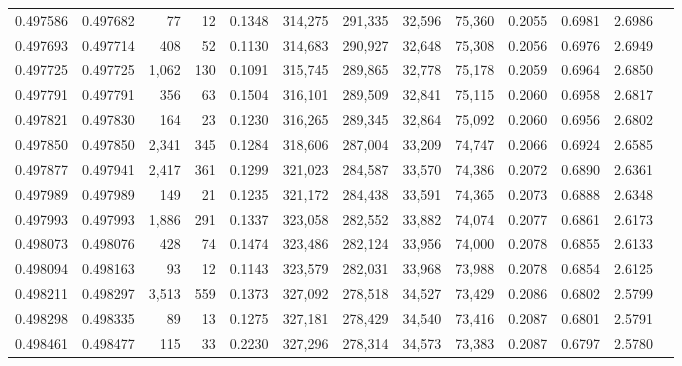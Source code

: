 \begin{tabular}{rrrrrrrrrrrrr}
0.497586 & 0.497682 &    77 &    12 &                                     0.1348 & 314,275 & 291,335 &  32,596 &  75,360 & 0.2055 & 0.6981 & 2.6986 \\
0.497693 & 0.497714 &   408 &    52 &                                     0.1130 & 314,683 & 290,927 &  32,648 &  75,308 & 0.2056 & 0.6976 & 2.6949 \\
0.497725 & 0.497725 & 1,062 &   130 &                                     0.1091 & 315,745 & 289,865 &  32,778 &  75,178 & 0.2059 & 0.6964 & 2.6850 \\
0.497791 & 0.497791 &   356 &    63 &                                     0.1504 & 316,101 & 289,509 &  32,841 &  75,115 & 0.2060 & 0.6958 & 2.6817 \\
0.497821 & 0.497830 &   164 &    23 &                                     0.1230 & 316,265 & 289,345 &  32,864 &  75,092 & 0.2060 & 0.6956 & 2.6802 \\
0.497850 & 0.497850 & 2,341 &   345 &                                     0.1284 & 318,606 & 287,004 &  33,209 &  74,747 & 0.2066 & 0.6924 & 2.6585 \\
0.497877 & 0.497941 & 2,417 &   361 &                                     0.1299 & 321,023 & 284,587 &  33,570 &  74,386 & 0.2072 & 0.6890 & 2.6361 \\
0.497989 & 0.497989 &   149 &    21 &                                     0.1235 & 321,172 & 284,438 &  33,591 &  74,365 & 0.2073 & 0.6888 & 2.6348 \\
0.497993 & 0.497993 & 1,886 &   291 &                                     0.1337 & 323,058 & 282,552 &  33,882 &  74,074 & 0.2077 & 0.6861 & 2.6173 \\
0.498073 & 0.498076 &   428 &    74 &                                     0.1474 & 323,486 & 282,124 &  33,956 &  74,000 & 0.2078 & 0.6855 & 2.6133 \\
0.498094 & 0.498163 &    93 &    12 &                                     0.1143 & 323,579 & 282,031 &  33,968 &  73,988 & 0.2078 & 0.6854 & 2.6125 \\
0.498211 & 0.498297 & 3,513 &   559 &                                     0.1373 & 327,092 & 278,518 &  34,527 &  73,429 & 0.2086 & 0.6802 & 2.5799 \\
0.498298 & 0.498335 &    89 &    13 &                                     0.1275 & 327,181 & 278,429 &  34,540 &  73,416 & 0.2087 & 0.6801 & 2.5791 \\
0.498461 & 0.498477 &   115 &    33 &                                     0.2230 & 327,296 & 278,314 &  34,573 &  73,383 & 0.2087 & 0.6797 & 2.5780 \\

\end{tabular}
